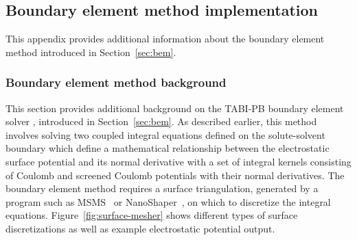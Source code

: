 \documentclass[12pt,titlepage]{article}
\newcommand{\revision}[1]{#1}
\begin{document}
\subsection{Boundary element method implementation} \label{app:bem}
This appendix provides additional information about the boundary element method introduced in Section~\ref{sec:bem}.

\subsubsection{Boundary element method background}
This section provides additional background on the TABI-PB boundary element solver \cite{Geng2013}, introduced in Section~\ref{sec:bem}.
As described earlier, this method involves solving two coupled integral equations defined on the solute-solvent boundary \revision{which} define a mathematical relationship between the electrostatic surface potential and its normal derivative with a set of integral kernels consisting of Coulomb and screened Coulomb potentials with their normal derivatives.
The boundary element method requires a surface triangulation, generated by a program such as MSMS~\cite{Sanner1995} or NanoShaper~\cite{Decherchi2013}, on which to discretize the integral equations.
Figure~\ref{fig:surface-mesher} shows different types of surface discretizations as well as example electrostatic potential output.
\end{document}
